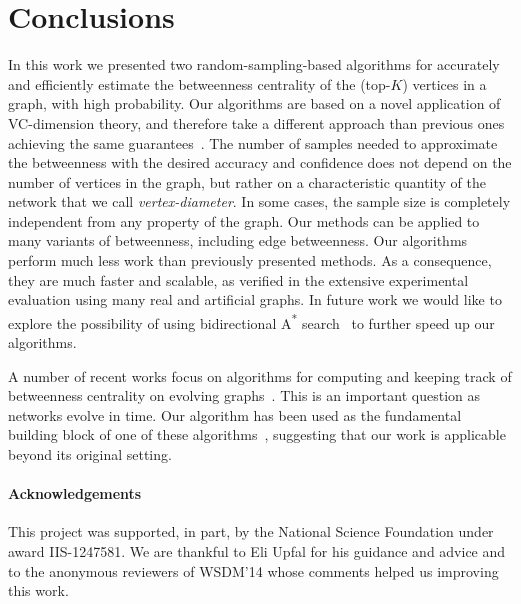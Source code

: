 \section{Conclusions}\label{sec:concl}
In this work we presented two random-sampling-based algorithms for accurately and
efficiently estimate the betweenness centrality of the (top-$K$) vertices in a
graph, with high probability.
Our algorithms are based on a novel application of VC-dimension theory, and
therefore take a different approach than previous ones achieving the same
guarantees~\citep{BrandesP07,GeisbergerSS08,JacobKLPT05}. The number of samples
needed to approximate the betweenness with the desired accuracy and confidence
does not depend on the number of vertices in the graph, but rather on a
characteristic quantity of the network that we call
\emph{vertex-diameter}. In some cases, the sample size is completely
independent from any property of the graph. %
\ifproof
Our methods can be applied to many variants of betweenness, including edge
betweenness. %
\fi
Our algorithms perform much less work than previously presented methods. %
As a consequence, they are much faster and
scalable, as verified in the extensive experimental
evaluation using many real and artificial graphs. 
\ifdmkd
\else
In future work we would like
to explore the possibility of using bidirectional A\textsuperscript{*}
search~\citep{Pohl69,KaindlK97} to further speed up our algorithms.  
\fi

A number of recent works focus on algorithms for computing and keeping track of
betweenness centrality on evolving
graphs~\citep{KourtellisMB14,Yoshida14,BergaminiMS14}. This is an important
question as networks evolve in time. Our algorithm has been used as the
fundamental building block of one of these algorithms~\citep{BergaminiMS14},
suggesting that our work is applicable beyond its original setting.


\ifdmkd
\else
\paragraph*{Acknowledgements} This project was supported, in part, by the
National Science Foundation under award IIS-1247581. We are thankful to Eli
Upfal for his guidance and advice and to the anonymous reviewers of WSDM'14
whose comments helped us improving this work.
\fi


